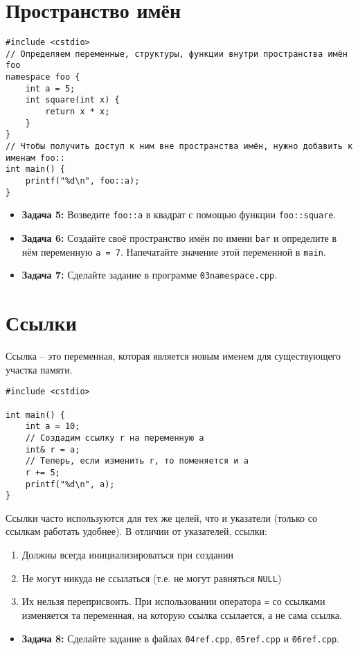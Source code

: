 \documentclass{article}
\begin{document}
\section*{Пространство имён}
\begin{lstlisting}
#include <cstdio>
// Определяем переменные, структуры, функции внутри пространства имён foo
namespace foo {
	int a = 5;
	int square(int x) {
		return x * x;
	}
}
// Чтобы получить доступ к ним вне пространства имён, нужно добавить к именам foo::
int main() {
	printf("%d\n", foo::a);
}
\end{lstlisting}
\begin{itemize}
\item \textbf{Задача 5:} Возведите \texttt{foo::a} в квадрат с помощью функции \texttt{foo::square}. 
\item \textbf{Задача 6:} Создайте своё пространство имён по имени \texttt{bar} и определите в нём переменную \texttt{a = 7}. Напечатайте значение этой переменной в \texttt{main}.
\item \textbf{Задача 7:} Сделайте задание в программе \texttt{03namespace.cpp}.
\end{itemize}

\section*{Ссылки}
Ссылка -- это переменная, которая является новым именем для существующего участка памяти. 
\begin{lstlisting}
#include <cstdio>

int main() {
	int a = 10;
	// Создадим ссылку r на переменную a
	int& r = a;
	// Теперь, если изменить r, то поменяется и a
	r += 5;
	printf("%d\n", a);
}
\end{lstlisting}
Ссылки часто используются для тех же целей, что и указатели (только со ссылкам работать удобнее).
В отличии от указателей, ссылки:
\begin{enumerate}
\item Должны всегда инициализироваться при создании
\item Не могут никуда не ссылаться (т.е. не могут равняться \texttt{NULL})
\item Их нельзя переприсвоить. При использовании оператора \texttt{=} со ссылками изменяется та переменная, на которую ссылка ссылается, а не сама ссылка.
\end{enumerate}
\begin{itemize}
\item \textbf{Задача 8:} Сделайте задание в файлах \texttt{04ref.cpp}, \texttt{05ref.cpp} и \texttt{06ref.cpp}.
\end{itemize}
\end{document}
